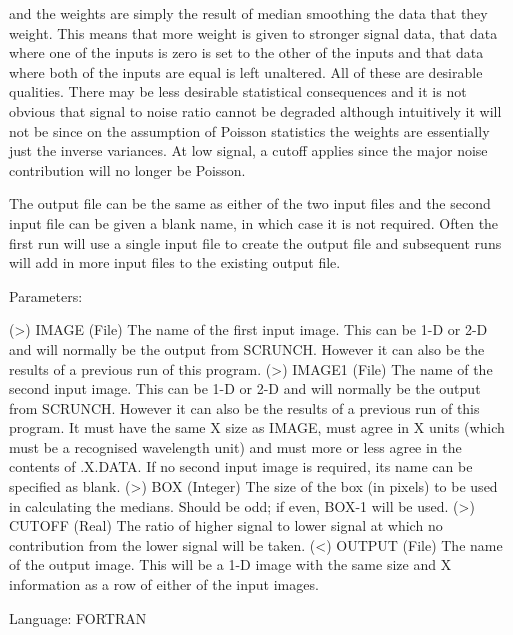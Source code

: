 \begin{description}
\begin{description}
\begin{terminalv}
    and the weights are simply the result of median smoothing the data
    that they weight. This means that more weight is given to stronger
    signal data, that data where one of the inputs is zero is set to
    the other of the inputs and that data where both of the inputs are
    equal is left unaltered. All of these are desirable qualities.
    There may be less desirable statistical consequences and it is not
    obvious that signal to noise ratio cannot be degraded although
    intuitively it will not be since on the assumption of Poisson
    statistics the weights are essentially just the inverse variances.
    At low signal, a cutoff applies since the major noise contribution
    will no longer be Poisson.

    The output file can be the same as either of the two input files
    and the second input file can be given a blank name, in which case
    it is not required. Often the first run will use a single input
    file to create the output file and subsequent runs will add in
    more input files to the existing output file.

 Parameters:

    (>) IMAGE    (File) The name of the first input image. This can be
                 1-D or 2-D and will normally be the output from
                 SCRUNCH.  However it can also be the results of a
                 previous run of this program.
    (>) IMAGE1   (File) The name of the second input image. This can
                 be 1-D or 2-D and will normally be the output from
                 SCRUNCH. However it can also be the results of a
                 previous run of this program. It must have the same X
                 size as IMAGE, must agree in X units (which must be
                 a recognised wavelength unit) and must more or less
                 agree in the contents of .X.DATA. If no second
                 input image is required, its name can be specified
                 as blank.
    (>) BOX      (Integer) The size of the box (in pixels) to be used
                 in calculating the medians.  Should be odd; if even,
                 BOX-1 will be used.
    (>) CUTOFF   (Real) The ratio of higher signal to lower signal at
                 which no contribution from the lower signal will be
                 taken.
    (<) OUTPUT   (File) The name of the output image. This will be
                 a 1-D image with the same size and X information as a
                 row of either of the input images.

 Language:
    FORTRAN


\end{terminalv}
\end{description}
\end{description}
